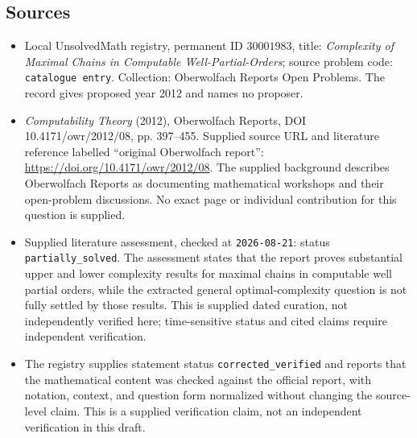 \documentclass[11pt]{article}
\begin{document}
\subsection{Sources}
\begin{itemize}
\item Local UnsolvedMath registry, permanent ID \(30001983\), title: \emph{Complexity of Maximal Chains in Computable Well-Partial-Orders}; source problem code: \texttt{catalogue entry}. Collection: Oberwolfach Reports Open Problems. The record gives proposed year 2012 and names no proposer.
\item \emph{Computability Theory} (2012), Oberwolfach Reports, DOI 10.4171/owr/2012/08, pp. 397--455. Supplied source URL and literature reference labelled ``original Oberwolfach report'': \url{https://doi.org/10.4171/owr/2012/08}. The supplied background describes Oberwolfach Reports as documenting mathematical workshops and their open-problem discussions. No exact page or individual contribution for this question is supplied.
\item Supplied literature assessment, checked at \texttt{2026-08-21}: status \texttt{partially\_solved}. The assessment states that the report proves substantial upper and lower complexity results for maximal chains in computable well partial orders, while the extracted general optimal-complexity question is not fully settled by those results. This is supplied dated curation, not independently verified here; time-sensitive status and cited claims require independent verification.
\item The registry supplies statement status \texttt{corrected\_verified} and reports that the mathematical content was checked against the official report, with notation, context, and question form normalized without changing the source-level claim. This is a supplied verification claim, not an independent verification in this draft.
\end{itemize}
\end{document}
